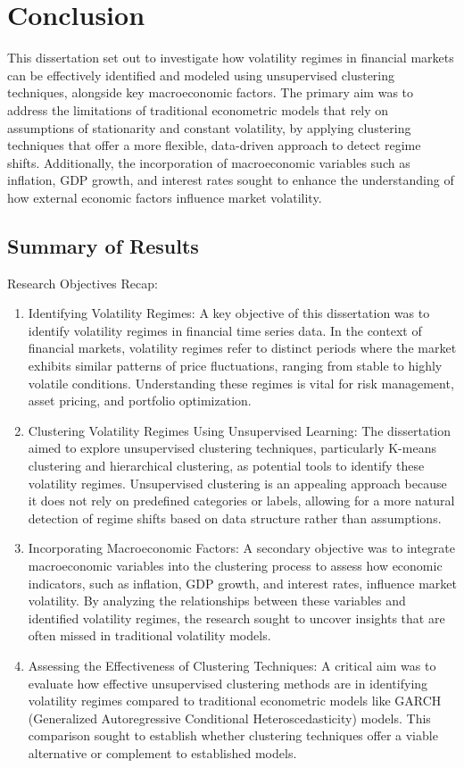 \chapter{Conclusion}

This dissertation set out to investigate how volatility regimes in financial markets can be effectively identified and modeled using unsupervised clustering techniques, alongside key macroeconomic factors. The primary aim was to address the limitations of traditional econometric models that rely on assumptions of stationarity and constant volatility, by applying clustering techniques that offer a more flexible, data-driven approach to detect regime shifts. Additionally, the incorporation of macroeconomic variables such as inflation, GDP growth, and interest rates sought to enhance the understanding of how external economic factors influence market volatility.

\section{Summary of Results}

Research Objectives Recap:
\begin{enumerate}

\item Identifying Volatility Regimes: A key objective of this dissertation was to identify volatility regimes in financial time series data. In the context of financial markets, volatility regimes refer to distinct periods where the market exhibits similar patterns of price fluctuations, ranging from stable to highly volatile conditions. Understanding these regimes is vital for risk management, asset pricing, and portfolio optimization.
\item Clustering Volatility Regimes Using Unsupervised Learning: The dissertation aimed to explore unsupervised clustering techniques, particularly K-means clustering and hierarchical clustering, as potential tools to identify these volatility regimes. Unsupervised clustering is an appealing approach because it does not rely on predefined categories or labels, allowing for a more natural detection of regime shifts based on data structure rather than assumptions.
\item Incorporating Macroeconomic Factors: A secondary objective was to integrate macroeconomic variables into the clustering process to assess how economic indicators, such as inflation, GDP growth, and interest rates, influence market volatility. By analyzing the relationships between these variables and identified volatility regimes, the research sought to uncover insights that are often missed in traditional volatility models.
\item Assessing the Effectiveness of Clustering Techniques: A critical aim was to evaluate how effective unsupervised clustering methods are in identifying volatility regimes compared to traditional econometric models like GARCH (Generalized Autoregressive Conditional Heteroscedasticity) models. This comparison sought to establish whether clustering techniques offer a viable alternative or complement to established models.

\end{enumerate}

